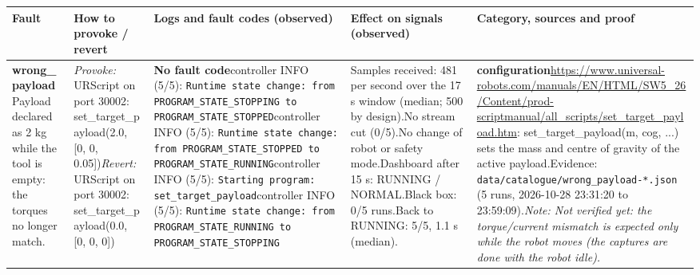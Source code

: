 \documentclass[10pt]{article}
\begin{document}
\newpage
\footnotesize
\begin{longtable}{@{}>{\raggedright\arraybackslash}p{2.7cm}>{\raggedright\arraybackslash}p{4.0cm}>{\raggedright\arraybackslash}p{7.6cm}>{\raggedright\arraybackslash}p{5.2cm}>{\raggedright\arraybackslash}p{6.0cm}@{}}
\toprule
\textbf{Fault} & \textbf{How to provoke / revert} & \textbf{Logs and fault codes (observed)} & \textbf{Effect on signals (observed)} & \textbf{Category, sources and proof} \\
\midrule
\endhead
\textbf{wrong\_\allowbreak{}payload}\newline Payload declared as 2 kg while the tool is empty: the torques no longer match. & \textit{Provoke:} URScript on port 30002: set\_\allowbreak{}target\_\allowbreak{}payload(2.0,\allowbreak{} [0,\allowbreak{} 0,\allowbreak{} 0.05])\newline\textit{Revert:} URScript on port 30002: set\_\allowbreak{}target\_\allowbreak{}payload(0.0,\allowbreak{} [0,\allowbreak{} 0,\allowbreak{} 0]) & \textbf{No fault code}\newline \textsf{controller} INFO (5/5): \texttt{Runtime state change: from PROGRAM\_\allowbreak{}STATE\_\allowbreak{}STOPPING to PROGRAM\_\allowbreak{}STATE\_\allowbreak{}STOPPED}\newline \textsf{controller} INFO (5/5): \texttt{Runtime state change: from PROGRAM\_\allowbreak{}STATE\_\allowbreak{}STOPPED to PROGRAM\_\allowbreak{}STATE\_\allowbreak{}RUNNING}\newline \textsf{controller} INFO (5/5): \texttt{Starting program: set\_\allowbreak{}target\_\allowbreak{}payload}\newline \textsf{controller} INFO (5/5): \texttt{Runtime state change: from PROGRAM\_\allowbreak{}STATE\_\allowbreak{}RUNNING to PROGRAM\_\allowbreak{}STATE\_\allowbreak{}STOPPING} & Samples received: 481 per second over the 17 s window (median; 500 by design).\newline No stream cut (0/5).\newline No change of robot or safety mode.\newline Dashboard after 15 s: RUNNING / NORMAL.\newline Black box: 0/5 runs.\newline Back to RUNNING: 5/5, 1.1 s (median). & \textbf{configuration}\newline \url{https://www.universal-robots.com/manuals/EN/HTML/SW5_26/Content/prod-scriptmanual/all_scripts/set_target_payload.htm}: set\_\allowbreak{}target\_\allowbreak{}payload(m,\allowbreak{} cog,\allowbreak{} ...) sets the mass and centre of gravity of the active payload.\newline Evidence: \texttt{data/catalogue/wrong\_\allowbreak{}payload-*.json} (5 runs, 2026-10-28 23:31:20 to 23:59:09).\newline \textit{Note: Not verified yet: the torque/current mismatch is expected only while the robot moves (the captures are done with the robot idle).} \\ \midrule

\end{longtable}
\end{document}
